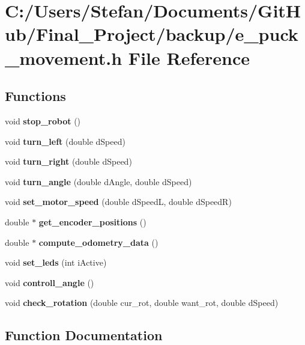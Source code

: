 \section{C\-:/\-Users/\-Stefan/\-Documents/\-Git\-Hub/\-Final\-\_\-\-Project/backup/e\-\_\-puck\-\_\-movement.h File Reference}
\label{backup_2e__puck__movement_8h}
\subsection*{Functions}
\begin{DoxyCompactItemize}
\item 
void {\bf stop\-\_\-robot} ()
\item 
void {\bf turn\-\_\-left} (double d\-Speed)
\item 
void {\bf turn\-\_\-right} (double d\-Speed)
\item 
void {\bf turn\-\_\-angle} (double d\-Angle, double d\-Speed)
\item 
void {\bf set\-\_\-motor\-\_\-speed} (double d\-Speed\-L, double d\-Speed\-R)
\item 
double $\ast$ {\bf get\-\_\-encoder\-\_\-positions} ()
\item 
double $\ast$ {\bf compute\-\_\-odometry\-\_\-data} ()
\item 
void {\bf set\-\_\-leds} (int i\-Active)
\item 
void {\bf controll\-\_\-angle} ()
\item 
void {\bf check\-\_\-rotation} (double cur\-\_\-rot, double want\-\_\-rot, double d\-Speed)
\end{DoxyCompactItemize}


\subsection{Function Documentation}
